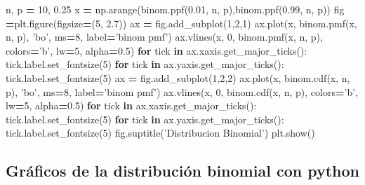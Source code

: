 \documentclass[]{book}
\newenvironment{Shaded}{\begin{snugshade}}{\end{snugshade}}
\newcommand{\ControlFlowTok}[1]{\textcolor[rgb]{0.13,0.29,0.53}{\textbf{#1}}}
\newcommand{\DecValTok}[1]{\textcolor[rgb]{0.00,0.00,0.81}{#1}}
\newcommand{\FloatTok}[1]{\textcolor[rgb]{0.00,0.00,0.81}{#1}}
\newcommand{\KeywordTok}[1]{\textcolor[rgb]{0.13,0.29,0.53}{\textbf{#1}}}
\newcommand{\NormalTok}[1]{#1}
\newcommand{\OperatorTok}[1]{\textcolor[rgb]{0.81,0.36,0.00}{\textbf{#1}}}
\newcommand{\StringTok}[1]{\textcolor[rgb]{0.31,0.60,0.02}{#1}}
\begin{document}
\begin{Shaded}
\begin{Highlighting}[]
\NormalTok{n, p }\OperatorTok{=} \DecValTok{10}\NormalTok{, }\FloatTok{0.25}
\NormalTok{x }\OperatorTok{=}\NormalTok{ np.arange(binom.ppf(}\FloatTok{0.01}\NormalTok{, n, p),binom.ppf(}\FloatTok{0.99}\NormalTok{, n, p))}
\NormalTok{fig }\OperatorTok{=}\NormalTok{plt.figure(figsize}\OperatorTok{=}\NormalTok{(}\DecValTok{5}\NormalTok{, }\FloatTok{2.7}\NormalTok{))}
\NormalTok{ax }\OperatorTok{=}\NormalTok{ fig.add_subplot(}\DecValTok{1}\NormalTok{,}\DecValTok{2}\NormalTok{,}\DecValTok{1}\NormalTok{)}
\NormalTok{ax.plot(x, binom.pmf(x, n, p), }\StringTok{'bo'}\NormalTok{, ms}\OperatorTok{=}\DecValTok{8}\NormalTok{, label}\OperatorTok{=}\StringTok{'binom pmf'}\NormalTok{)}
\NormalTok{ax.vlines(x, }\DecValTok{0}\NormalTok{, binom.pmf(x, n, p), colors}\OperatorTok{=}\StringTok{'b'}\NormalTok{, lw}\OperatorTok{=}\DecValTok{5}\NormalTok{, alpha}\OperatorTok{=}\FloatTok{0.5}\NormalTok{)}
\ControlFlowTok{for}\NormalTok{ tick }\KeywordTok{in}\NormalTok{ ax.xaxis.get_major_ticks():}
\NormalTok{  tick.label.set_fontsize(}\DecValTok{5}\NormalTok{)}
\ControlFlowTok{for}\NormalTok{ tick }\KeywordTok{in}\NormalTok{ ax.yaxis.get_major_ticks():}
\NormalTok{  tick.label.set_fontsize(}\DecValTok{5}\NormalTok{) }
\NormalTok{ax }\OperatorTok{=}\NormalTok{ fig.add_subplot(}\DecValTok{1}\NormalTok{,}\DecValTok{2}\NormalTok{,}\DecValTok{2}\NormalTok{)}
\NormalTok{ax.plot(x, binom.cdf(x, n, p), }\StringTok{'bo'}\NormalTok{, ms}\OperatorTok{=}\DecValTok{8}\NormalTok{, label}\OperatorTok{=}\StringTok{'binom pmf'}\NormalTok{)}
\NormalTok{ax.vlines(x, }\DecValTok{0}\NormalTok{, binom.cdf(x, n, p), colors}\OperatorTok{=}\StringTok{'b'}\NormalTok{, lw}\OperatorTok{=}\DecValTok{5}\NormalTok{, alpha}\OperatorTok{=}\FloatTok{0.5}\NormalTok{)}
\ControlFlowTok{for}\NormalTok{ tick }\KeywordTok{in}\NormalTok{ ax.xaxis.get_major_ticks():}
\NormalTok{  tick.label.set_fontsize(}\DecValTok{5}\NormalTok{)}
\ControlFlowTok{for}\NormalTok{ tick }\KeywordTok{in}\NormalTok{ ax.yaxis.get_major_ticks():}
\NormalTok{  tick.label.set_fontsize(}\DecValTok{5}\NormalTok{)}
\NormalTok{fig.suptitle(}\StringTok{'Distribucion Binomial'}\NormalTok{)}
\NormalTok{plt.show()}
\end{Highlighting}
\end{Shaded}

\hypertarget{gruxe1ficos-de-la-distribuciuxf3n-binomial-con-python-2}{%
\subsection{Gráficos de la distribución binomial con python}\label{gruxe1ficos-de-la-distribuciuxf3n-binomial-con-python-2}}
\end{document}
